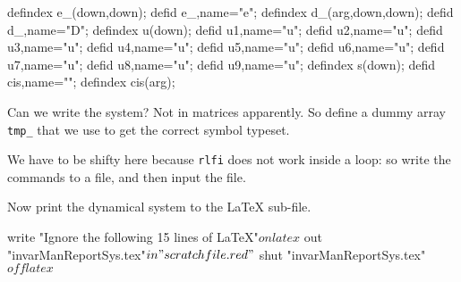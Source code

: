 \documentclass[11pt,a5paper]{article}
\def\cis\big(#1\big){\,e^{#1i}}
\begin{document}
\begin{reduce}
defindex e_(down,down);
defid e_,name="e";
defindex d_(arg,down,down);
defid d_,name="D";
defindex u(down);
defid u1,name="u"; 
defid u2,name="u"; 
defid u3,name="u"; 
defid u4,name="u"; 
defid u5,name="u"; 
defid u6,name="u"; 
defid u7,name="u"; 
defid u8,name="u"; 
defid u9,name="u"; 
defindex s(down);
defid cis,name="\cis";
defindex cis(arg);
\end{reduce}


Can we write the system?  
Not in matrices apparently.
So define a dummy array \verb|tmp_| that we use to get the correct symbol typeset.

We have to be shifty here because \verb|rlfi| does not work inside a loop: so write the commands to a file, and then input the file.

Now print the dynamical system to the LaTeX sub-file.
\begin{reduce}
write "Ignore the following 15 lines of LaTeX"$
on latex$
out "invarManReportSys.tex"$
in "scratchfile.red"$
shut "invarManReportSys.tex"$
off latex$
\end{reduce}
\end{document}
